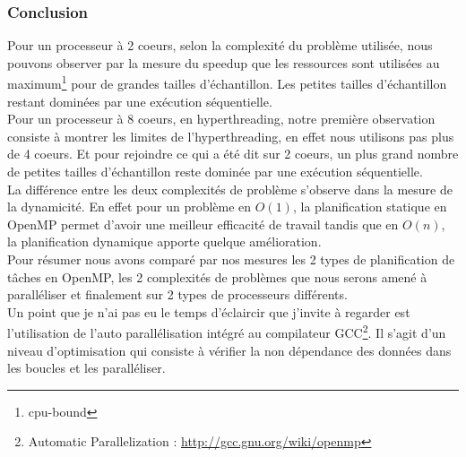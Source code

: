 \subsubsection{Conclusion}

Pour un processeur à 2 coeurs, selon la complexité du problème utilisée, nous pouvons observer par la mesure du speedup que les ressources sont utilisées au maximum\footnote{cpu-bound} pour de grandes tailles d'échantillon. Les petites tailles d'échantillon restant dominées par une exécution séquentielle.\\

Pour un processeur à 8 coeurs, en hyperthreading, notre première observation consiste à montrer les limites de l'hyperthreading, en effet nous utilisons pas plus de 4 coeurs. Et pour rejoindre ce qui a été dit sur 2 coeurs, un plus grand nombre de petites tailles d'échantillon reste dominée par une exécution séquentielle.\\

La différence entre les deux complexités de problème s'observe dans la mesure de la dynamicité. En effet pour un problème en $O(1)$, la planification statique en OpenMP permet d'avoir une meilleur efficacité de travail tandis que en $O(n)$, la planification dynamique apporte quelque amélioration.\\

Pour résumer nous avons comparé par nos mesures les 2 types de planification de tâches en OpenMP, les 2 complexités de problèmes que nous serons amené à paralléliser et finalement sur 2 types de processeurs différents.\\

Un point que je n'ai pas eu le temps d'éclaircir que j'invite à regarder est l'utilisation de l'auto parallélisation intégré au compilateur GCC\footnote{Automatic Parallelization : \url{http://gcc.gnu.org/wiki/openmp}}. Il s'agit d'un niveau d'optimisation qui consiste à vérifier la non dépendance des données dans les boucles et les paralléliser.
